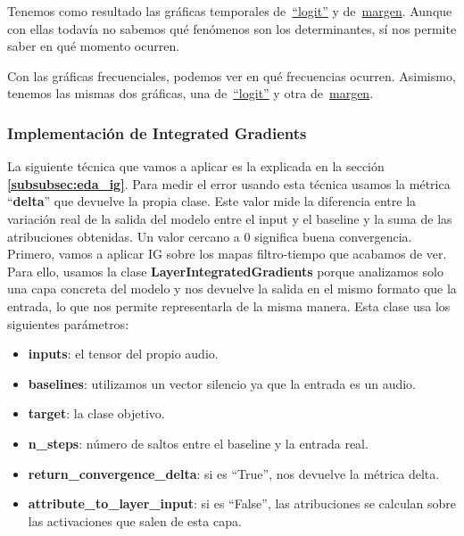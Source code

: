 Tenemos como resultado las gráficas temporales de~\href{https://github.com/NILGroup/tfg-2526-xplicavoz/blob/main/Memoria/imagenes/AASIST_hiding_temporal.png}{``logit''} y de~\href{https://github.com/NILGroup/tfg-2526-xplicavoz/blob/main/Memoria/imagenes/AASIST_hiding_temporal_margen.png}{margen}. Aunque con ellas todavía no sabemos qué fenómenos son los determinantes, sí nos permite saber en qué momento ocurren.

Con las gráficas frecuenciales, podemos ver en qué frecuencias ocurren. Asimismo, tenemos las mismas dos gráficas, una de~\href{https://github.com/NILGroup/tfg-2526-xplicavoz/blob/main/Memoria/imagenes/AASIST_hiding_frecuencial.png}{``logit''} y otra de~\href{https://github.com/NILGroup/tfg-2526-xplicavoz/blob/main/Memoria/imagenes/AASIST_hiding_frecuencial_margen.png}{margen}.

\subsubsection*{Implementación de Integrated Gradients}

La siguiente técnica que vamos a aplicar es la explicada en la sección \textbf{\ref{subsubsec:eda_ig}}. Para medir el error usando esta técnica usamos la métrica ``\textbf{delta}'' que devuelve la propia clase. Este valor mide la diferencia entre la variación real de la salida del modelo entre el input y el baseline y la suma de las atribuciones obtenidas. Un valor cercano a 0 significa buena convergencia.
Primero, vamos a aplicar IG sobre los mapas filtro-tiempo que acabamos de ver. Para ello, usamos la clase \textbf{LayerIntegratedGradients} porque analizamos solo una capa concreta del modelo y nos devuelve la salida en el mismo formato que la entrada, lo que nos permite representarla de la misma manera. Esta clase usa los siguientes parámetros:
\begin{itemize}
    \item \textbf{inputs}: el tensor del propio audio.
    \item \textbf{baselines}: utilizamos un vector silencio ya que la entrada es un audio.
    \item \textbf{target}: la clase objetivo.
    \item \textbf{n\_steps}: número de saltos entre el baseline y la entrada real.
    \item \textbf{return\_convergence\_delta}: si es ``True'', nos devuelve la métrica delta.
    \item \textbf{attribute\_to\_layer\_input}: si es ``False'', las atribuciones se calculan sobre las activaciones que salen de esta capa.
\end{itemize}

